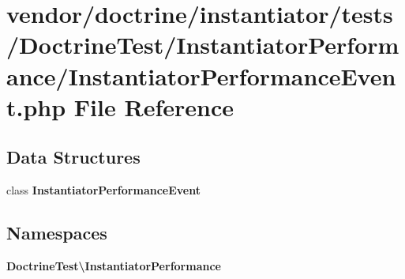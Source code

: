 \section{vendor/doctrine/instantiator/tests/\+Doctrine\+Test/\+Instantiator\+Performance/\+Instantiator\+Performance\+Event.php File Reference}
\label{_instantiator_performance_event_8php}
\subsection*{Data Structures}
\begin{DoxyCompactItemize}
\item 
class {\bf Instantiator\+Performance\+Event}
\end{DoxyCompactItemize}
\subsection*{Namespaces}
\begin{DoxyCompactItemize}
\item 
 {\bf Doctrine\+Test\textbackslash{}\+Instantiator\+Performance}
\end{DoxyCompactItemize}

